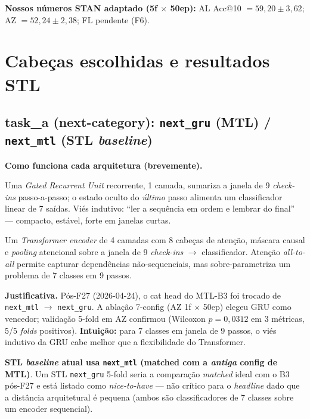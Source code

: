 \documentclass[11pt,a4paper]{article}
\begin{document}
\textbf{Nossos números STAN adaptado (5f $\times$ 50ep):} AL Acc@10 $= 59{,}20 \pm 3{,}62$; AZ $= 52{,}24 \pm 2{,}38$; FL pendente (F6).

\section{Cabeças escolhidas e resultados STL}

\subsection{task\_a (next-category): \texttt{next\_gru} (MTL) / \texttt{next\_mtl} (STL \textit{baseline})}

\noindent\textbf{Como funciona cada arquitetura (brevemente).}

\begin{description}[leftmargin=1em,style=nextline,topsep=0pt,itemsep=2pt]
\item[\texttt{next\_gru}.] Uma \textit{Gated Recurrent Unit} recorrente, 1 camada, sumariza a janela de 9 \textit{check-ins} passo-a-passo; o estado oculto do \emph{último} passo alimenta um classificador linear de 7 saídas. Viés indutivo: ``ler a sequência em ordem e lembrar do final'' --- compacto, estável, forte em janelas curtas.
\item[\texttt{next\_mtl} (Transformer).] Um \textit{Transformer encoder} de 4 camadas com 8 cabeças de atenção, máscara causal e \textit{pooling} atencional sobre a janela de 9 \textit{check-ins} $\to$ classificador. Atenção \textit{all-to-all} permite capturar dependências não-sequenciais, mas sobre-parametriza um problema de 7 classes em 9 passos.
\end{description}

\noindent\textbf{Justificativa.} Pós-F27 (2026-04-24), o cat head do MTL-B3 foi trocado de \texttt{next\_mtl} $\to$ \texttt{next\_gru}. A ablação 7-config (AZ 1f $\times$ 50ep) elegeu GRU como vencedor; validação 5-fold em AZ confirmou (Wilcoxon $p=0{,}0312$ em 3 métricas, 5/5 \textit{folds} positivos). \textbf{Intuição:} para 7 classes em janela de 9 passos, o viés indutivo da GRU cabe melhor que a flexibilidade do Transformer.

\noindent\textbf{STL \textit{baseline} atual usa \texttt{next\_mtl} (matched com a \emph{antiga} config de MTL)}. Um STL \texttt{next\_gru} 5-fold seria a comparação \emph{matched} ideal com o B3 pós-F27 e está listado como \textit{nice-to-have} --- não crítico para o \textit{headline} dado que a distância arquitetural é pequena (ambos são classificadores de 7 classes sobre um encoder sequencial).
\end{document}
